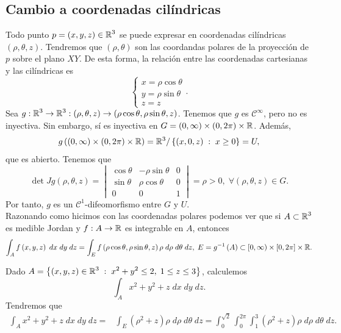 \subsection{Cambio a coordenadas cilíndricas}
Todo punto $\displaystyle p =\left(x,y,z\right)\in \mathbb{R}^{3} $ se puede expresar en coordenadas cilíndricas $\displaystyle \left(\rho, \theta, z\right) $. Tendremos que $\displaystyle \left(\rho, \theta \right) $ son las coordandas polares de la proyección de $\displaystyle p $ sobre el plano $\displaystyle XY $. De esta forma, la relación entre las coordenadas cartesianas y las cilíndricas es
\[
\begin{cases}
x = \rho\cos\theta \\
y = \rho\sin\theta \\
z = z
\end{cases}
.\]
Sea $\displaystyle g : \mathbb{R}^{3}\to \mathbb{R}^{3} : \left(\rho, \theta, z\right)\to \left(\rho\cos\theta, \rho\sin\theta, z\right) $. Tenemos que $\displaystyle g $ es $\displaystyle \mathcal{C}^{\infty} $, pero no es inyectiva. Sin embargo, sí es inyectiva en $\displaystyle G = \left(0,\infty\right)\times \left(0,2\pi \right) \times \mathbb{R} $. Además, 
\[g\left(\left(0,\infty\right)\times \left(0,2\pi \right)\times \mathbb{R}\right)=\mathbb{R}^{3} / \left\{ \left(x,0,z\right) \; : \; x \geq 0\right\} =U ,\]
que es abierto. Tenemos que 
\[\det Jg\left(\rho, \theta, z\right)=\begin{vmatrix} \cos\theta & -\rho\sin\theta & 0 \\ \sin\theta & \rho\cos\theta & 0 \\ 0 & 0 & 1 \end{vmatrix} =\rho > 0, \; \forall \left(\rho, \theta, z\right)\in G .\]
Por tanto, $\displaystyle g $ es un $\displaystyle \mathcal{C}^{1} $-difeomorfismo entre $\displaystyle G $ y $\displaystyle U $. \\
Razonando como hicimos con las coordenadas polares podemos ver que si $\displaystyle A \subset \mathbb{R}^{3} $ es medible Jordan y $\displaystyle f : A \to \mathbb{R} $ es integrable en $\displaystyle A $, entonces
\[\int _{A}f\left(x,y,z\right) \; dx \; dy \; dz = \int _{E}f\left(\rho\cos\theta, \rho\sin\theta, z\right)\rho \; d\rho \; d\theta \; dz, \; E =g^{-1}\left(A\right) \subset [0,\infty) \times \left[0,2\pi \right] \times \mathbb{R} .\]
\begin{eg}
	Dado $\displaystyle A = \left\{ \left(x,y,z\right)\in \mathbb{R}^{3} \; : \; x^{2}+y^{2}\leq 2, \; 1 \leq z \leq 3\right\}  $, calculemos
	\[\int _{A}x^{2}+y^{2}+z \; dx \; dy \; dz .\]
	Tendremos que 
	\[
	\begin{split}
		\int _{A}x^{2}+y^{2}+z \; dx \; dy \; dz = & \int _{E}\left(\rho^{2}+z\right)\rho \; d\rho \; d\theta \; dz = \int^{\sqrt{2}}_{0} \int^{2\pi }_{0} \int^{3}_{1} \left(\rho^{2}+z\right)\rho \; d\rho \; d\theta  \; dz.
	\end{split}
	\]
\end{eg}
